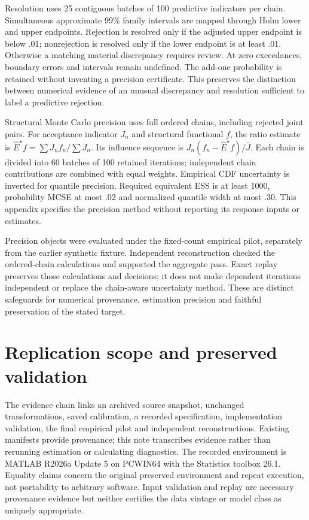 \documentclass[11pt,a4paper]{article}
\begin{document}
Resolution uses 25 contiguous batches of 100 predictive indicators per chain. Simultaneous approximate 99\% family intervals are mapped through Holm lower and upper endpoints. Rejection is resolved only if the adjusted upper endpoint is below .01; nonrejection is resolved only if the lower endpoint is at least .01. Otherwise a matching material discrepancy requires review. At zero exceedances, boundary errors and intervals remain undefined. The add-one probability is retained without inventing a precision certificate. This preserves the distinction between numerical evidence of an unusual discrepancy and resolution sufficient to label a predictive rejection.

Structural Monte Carlo precision uses full ordered chains, including rejected joint pairs. For acceptance indicator $J_n$ and structural functional $f$, the ratio estimate is $\widehat E^\star f=\sum J_nf_n/\sum J_n$. Its influence sequence is $J_n(f_n-\widehat E^\star f)/\bar J$. Each chain is divided into 60 batches of 100 retained iterations; independent chain contributions are combined with equal weights. Empirical CDF uncertainty is inverted for quantile precision. Required equivalent ESS is at least 1000, probability MCSE at most .02 and normalized quantile width at most .30. This appendix specifies the precision method without reporting its response inputs or estimates.

Precision objects were evaluated under the fixed-count empirical pilot, separately from the earlier synthetic fixture. Independent reconstruction checked the ordered-chain calculations and supported the aggregate pass. Exact replay preserves those calculations and decisions; it does not make dependent iterations independent or replace the chain-aware uncertainty method. These are distinct safeguards for numerical provenance, estimation precision and faithful preservation of the stated target.

\section{Replication scope and preserved validation}
The evidence chain links an archived source snapshot, unchanged transformations, saved calibration, a recorded specification, implementation validation, the final empirical pilot and independent reconstructions. Existing manifests provide provenance; this note transcribes evidence rather than rerunning estimation or calculating diagnostics. The recorded environment is MATLAB R2026a Update 5 on PCWIN64 with the Statistics toolbox 26.1. Equality claims concern the original preserved environment and repeat execution, not portability to arbitrary software. Input validation and replay are necessary provenance evidence but neither certifies the data vintage or model class as uniquely appropriate.
\end{document}
